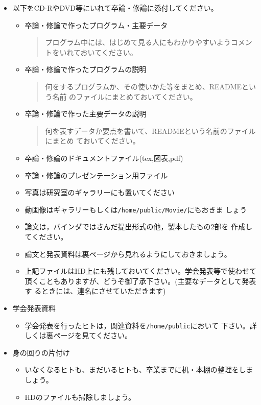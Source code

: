 \documentclass[11pt]{jarticle}
\begin{document}
\begin{itemize}
\item 以下をCD-RやDVD等にいれて卒論・修論に添付してください。
  \begin{itemize}
  \item 卒論・修論で作ったプログラム・主要データ
    \begin{quote}
      プログラム中には、はじめて見る人にもわかりやすいようコメントをいれておいてください。
    \end{quote}
  \item 卒論・修論で作ったプログラムの説明
    \begin{quote}
      何をするプログラムか、その使いかた等をまとめ、READMEという名前
      のファイルにまとめておいてください。
    \end{quote}
  \item 卒論・修論で作った主要データの説明
    \begin{quote}
      何を表すデータか要点を書いて、READMEという名前のファイルにまとめ
      ておいてください。 
    \end{quote}
  \item 卒論・修論のドキュメントファイル(tex,図表,pdf)
  \item 卒論・修論のプレゼンテーション用ファイル
  \item 写真は研究室のギャラリーにも置いてください
  \item 動画像はギャラリーもしくは\verb|/home/public/Movie/|にもおきま
    しょう
  \item 論文は，バインダではさんだ提出形式の他，製本したもの2部を
    作成してください。
  \item 論文と発表資料は裏ページから見れるようにしておきましょう。
  \item 上記ファイルはHD上にも残しておいてください。学会発表等で使わせて
    頂くこともありますが、どうぞ御了承下さい。(主要なデータとして発表す
    るときには、連名にさせていただきます)
  \end{itemize}
\item 学会発表資料
  \begin{itemize}
  \item 学会発表を行ったヒトは，関連資料を\verb|/home/public|において
    下さい。詳しくは裏ページを見てください。
  \end{itemize}
\item 身の回りの片付け
  \begin{itemize}
  \item いなくなるヒトも、まだいるヒトも、卒業までに机・本棚の整理をしましょう。
  \item HDのファイルも掃除しましょう。

\end{itemize}
\end{itemize}
\end{document}

